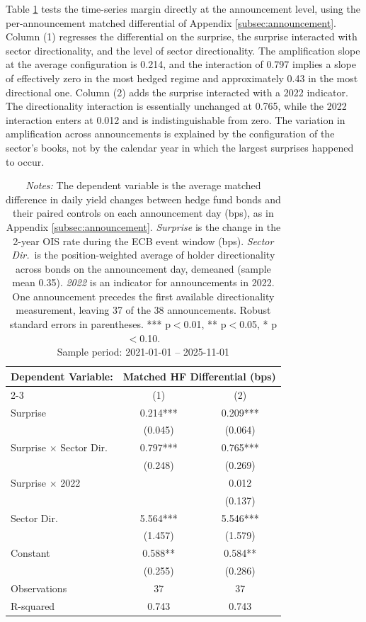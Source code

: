 \documentclass[english, 11pt, oneside]{article}
\begin{document}
Table \ref{tab:regime} tests the time-series margin directly at the announcement level, using the per-announcement matched differential of Appendix \ref{subsec:announcement}. Column (1) regresses the differential on the surprise, the surprise interacted with sector directionality, and the level of sector directionality. The amplification slope at the average configuration is 0.214, and the interaction of 0.797 implies a slope of effectively zero in the most hedged regime and approximately 0.43 in the most directional one. Column (2) adds the surprise interacted with a 2022 indicator. The directionality interaction is essentially unchanged at 0.765, while the 2022 interaction enters at 0.012 and is indistinguishable from zero. The variation in amplification across announcements is explained by the configuration of the sector's books, not by the calendar year in which the largest surprises happened to occur. \\

\begin{table}[h!]
\centering
\caption{\textbf{Announcement-Level Amplification and the Sector's Book}}
\footnotesize
\setlength{\tabcolsep}{10pt}
\renewcommand{\arraystretch}{1.1}
\begin{tabular}{l c c}
\toprule
\textbf{Dependent Variable:} & \multicolumn{2}{c}{\textbf{Matched HF Differential (bps)}} \\
\cmidrule(lr){2-3}
 & (1) & (2) \\
\midrule
Surprise & 0.214*** & 0.209*** \\
 & (0.045) & (0.064) \\
Surprise $\times$ Sector Dir.\ & 0.797*** & 0.765*** \\
 & (0.248) & (0.269) \\
Surprise $\times$ 2022 & & 0.012 \\
 & & (0.137) \\
Sector Dir.\ & 5.564*** & 5.546*** \\
 & (1.457) & (1.579) \\
Constant & 0.588** & 0.584** \\
 & (0.255) & (0.286) \\
\midrule
Observations & 37 & 37 \\
R-squared & 0.743 & 0.743 \\
\bottomrule
\end{tabular}
\label{tab:regime}
\caption*{\textit{Notes:} The dependent variable is the average matched difference in daily yield changes between hedge fund bonds and their paired controls on each announcement day (bps), as in Appendix \ref{subsec:announcement}. \textit{Surprise} is the change in the 2-year OIS rate during the ECB event window (bps). \textit{Sector Dir.}\ is the position-weighted average of holder directionality across bonds on the announcement day, demeaned (sample mean 0.35). \textit{2022} is an indicator for announcements in 2022. One announcement precedes the first available directionality measurement, leaving 37 of the 38 announcements. Robust standard errors in parentheses. *** p$<$0.01, ** p$<$0.05, * p$<$0.10. \\ Sample period: 2021-01-01 -- 2025-11-01}
\end{table}
\end{document}
